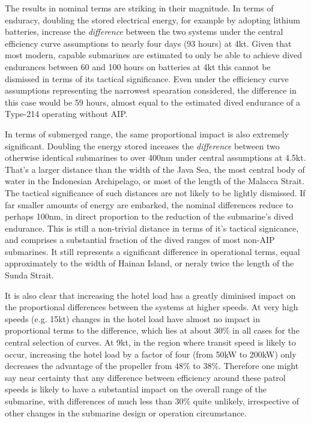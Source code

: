 \documentclass{article}\usepackage[]{graphicx}\usepackage[]{color}
\begin{document}
The results in nominal terms are striking in their magnitude.  In terms of enduracy, doubling the stored electrical energy, for example by adopting lithium batteries, increase the \textit{difference} between the two systems under the central efficiency curve assumptions to nearly four days (93 hours) at 4kt.  Given that most modern, capable submarines are estimated to only be able to achieve dived endurances between 60 and 100 hours on batteries at 4kt \parencite{buckingham2008submarine} this cannot be dismissed in terms of its tactical significance.  Even under the efficiency curve assumptions representing the narrowest spearation considered, the difference in this case would be 59 hours, almost equal to the estimated dived endurance of a Type-214 operating without AIP.

In terms of submerged range, the same proportional impact is also extremely significant.  Doubling the energy stored inceases the \textit{difference} between two otherwise identical submarines to over 400nm under central assumptions at 4.5kt.  That's a larger distance than the width of the Java Sea, the most central body of water in the Indonesian Archipelago, or most of the length of the Malacca Strait.  The tactical significance of such distances are not likely to be lightly dismissed. If far smaller amounts of energy are embarked, the nominal differences reduce to perhaps 100nm, in direct proportion to the reduction of the submarine's dived endurance.  This is still a non-trivial distance in terms of it's tactical signicance, and comprises a substantial fraction of the dived ranges of most non-AIP submarines.  It still represents a significant difference in operational terms, equal approximately to the width of Hainan Island, or neraly twice the length of the Sunda Strait.


It is also clear that increasing the hotel load has a greatly diminised impact on the proportional differences between the systems at higher speeds.  At very high speeds (e.g. 15kt) changes in the hotel load have almost no impact in proportional terms to the difference, which lies at about 30\% in all cases for the central selection of curves. At 9kt, in the region where transit speed is likely to occur, increasing the hotel load by a factor of four (from 50kW to 200kW) only decreases the advantage of the propeller from 48\% to 38\%. Therefore one might say near certainty that any difference between efficiency around these patrol speeds is likely to have a substantial impact on the overall range of the submarine, with differences of much less than 30\% quite unlikely, irrespective of other changes in the submarine design or operation circumstance.
\end{document}
